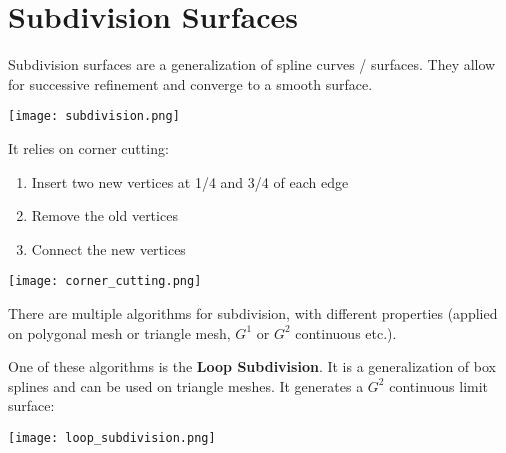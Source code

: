 \section{Subdivision Surfaces}

Subdivision surfaces are a generalization of spline curves / surfaces. They allow for successive refinement and converge to a smooth surface.
\begin{center}
	\texttt{[image: subdivision.png]}
\end{center}

It relies on corner cutting:
\begin{enumerate}
	\item Insert two new vertices at 1/4 and 3/4 of each edge
	\item Remove the old vertices
	\item Connect the new vertices
\end{enumerate}
\begin{center}
	\texttt{[image: corner\_cutting.png]}
\end{center}

There are multiple algorithms for subdivision, with different properties (applied on polygonal mesh or triangle mesh, $G^1$ or $G^2$ continuous etc.). \medskip

One of these algorithms is the \textbf{Loop Subdivision}. It is a generalization of box splines and can be used on triangle meshes. It generates a $G^2$ continuous limit surface:
\begin{center}
	\texttt{[image: loop\_subdivision.png]}
\end{center}
